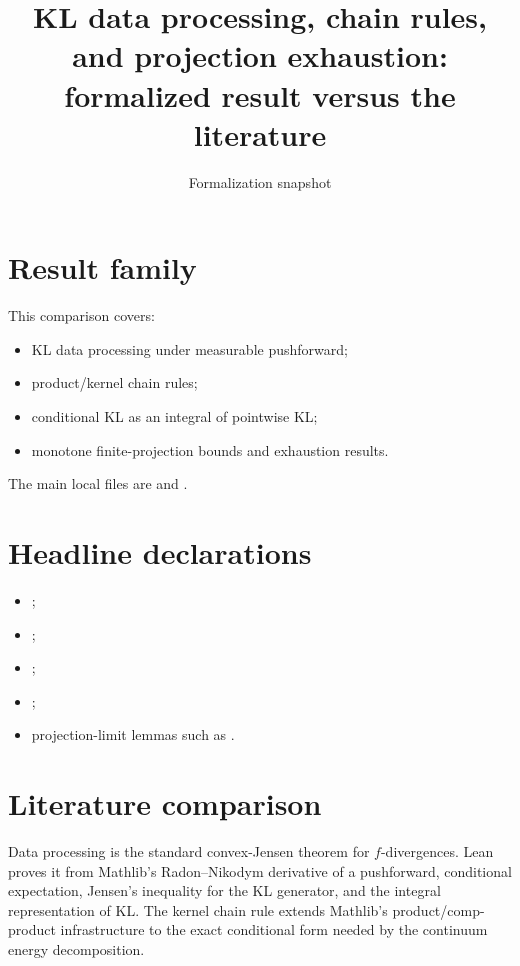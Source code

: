 \title{KL data processing, chain rules, and projection exhaustion: formalized result versus the literature}
\author{}
\date{Formalization snapshot \snapshot}

\maketitle
{}
\section{Result family}
This comparison covers:
\begin{itemize}[leftmargin=2em]
\item KL data processing under measurable pushforward;
\item product/kernel chain rules;
\item conditional KL as an integral of pointwise KL;
\item monotone finite-projection bounds and exhaustion results.
\end{itemize}
The main local files are  and
.

\section{Headline declarations}
\begin{itemize}[leftmargin=2em]
\item {};
\item {};
\item {};
\item {};
\item projection-limit lemmas such as .
\end{itemize}

\section{Literature comparison}
Data processing is the standard convex-Jensen theorem for $f$-divergences.  Lean proves it from Mathlib's Radon--Nikodym derivative of a pushforward, conditional expectation, Jensen's inequality for the KL generator, and the integral representation of KL.  The kernel chain rule extends Mathlib's product/comp-product infrastructure to the exact conditional form needed by the continuum energy decomposition.

